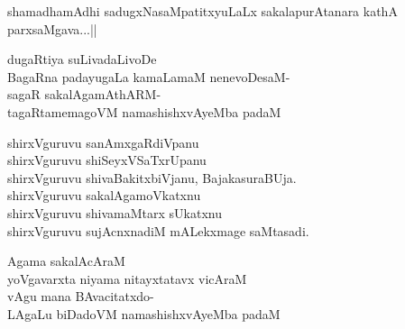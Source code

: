 \begin{entry}
\end{entry}

\begin{entry}
\begin{shl}
shamadhamAdhi sadugxNasaMpatitxyuLaLx sakalapurAtanara kathA parxsaMgava...||
\end{shl}
\end{entry}

\begin{entry}
\begin{shl}
dugaRtiya suLivadaLivoDe\\
BagaRna padayugaLa kamaLamaM nenevoDesaM-\\
sagaR sakalAgamAthARM-\\
tagaRtamemagoVM namashishxvAyeMba padaM
\end{shl}
\end{entry}

\begin{entry}
\gl{}
\begin{shl}
shirxVguruvu sanAmxgaRdiVpanu\\
shirxVguruvu shiSeyxVSaTxrUpanu\\
shirxVguruvu shivaBakitxbiVjanu, BajakasuraBUja.\\
shirxVguruvu sakalAgamoVkatxnu\\
shirxVguruvu shivamaMtarx sUkatxnu\\
shirxVguruvu sujAcnxnadiM mALekxmage saMtasadi.
\end{shl}
\end{entry}

\begin{entry}
\begin{shl}
Agama sakalAcAraM\\
yoVgavarxta niyama nitayxtatavx vicAraM\\
vAgu mana BAvacitatxdo-\\
LAgaLu biDadoVM namashishxvAyeMba padaM
\end{shl}
\end{entry}

